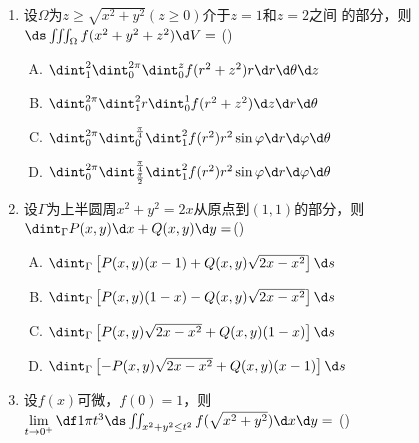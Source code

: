 \begin{enumerate}
  (A)$1$\hspace{1cm}(B)$\sqrt[3]{\df12}$\hspace{1cm}
  (C)$\sqrt[3]{\df34}$\hspace{1cm}(D)$\sqrt[3]{\df32}$
  \item 设$\Omega$为$z\geq{\sqrt{x^2+y^2}}(z\geq0)$介于$z=1$和$z=2$之间
  的部分，则$\ds\iiint_{\Omega}f(x^2+y^2+z^2)\d V=$
  (\underline{\hspace{1cm}})
  \begin{enumerate}[(A)]
    \item $\dint_1^2\dint_0^{2\pi}\dint_0^zf(r^2+z^2)r\d r\d\theta\d z$
    \item $\dint_0^{2\pi}\dint_1^2r\dint_0^1f(r^2+z^2)\d z\d r\d\theta$
    \item $\dint_0^{2\pi}\dint_0^{\frac{\pi}4}\dint_1^2
    f(r^2)r^2\sin\varphi\d r\d\varphi\d\theta$
    \item $\dint_0^{2\pi}\dint_{\frac{\pi}2}^{\frac{\pi}4}\dint_1^2
    f(r^2)r^2\sin\varphi\d r\d\varphi\d\theta$
  \end{enumerate}
  \item 设$\Gamma$为上半圆周$x^2+y^2=2x$从原点到$(1,1)$的部分，则
  $\dint_{\Gamma}P(x,y)\d x+Q(x,y)\d y=$(\underline{\hspace{1cm}})
  \begin{enumerate}[(A)]
    \item $\dint_{\Gamma}\left[P(x,y)(x-1)+Q(x,y)\sqrt{2x-x^2}\right]\d s$
    \item $\dint_{\Gamma}\left[P(x,y)(1-x)-Q(x,y)\sqrt{2x-x^2}\right]\d s$
    \item $\dint_{\Gamma}\left[P(x,y)\sqrt{2x-x^2}+Q(x,y)(1-x)\right]\d s$
    \item $\dint_{\Gamma}\left[-P(x,y)\sqrt{2x-x^2}+Q(x,y)(x-1)\right]\d s$
  \end{enumerate}
  \item 设$f(x)$可微，$f(0)=1$，则$\lim\limits_{t\to0^+}\df1{\pi t^3}
  \ds\iint_{x^2+y^2\leq t^2}  f(\sqrt{x^2+y^2})\d x\d y=$ 
  (\underline{\hspace{1cm}})
  

\end{enumerate}
